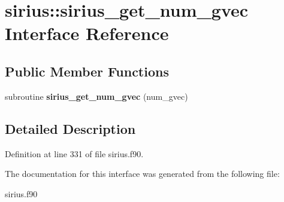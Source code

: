 \hypertarget{interfacesirius_1_1sirius__get__num__gvec}{}\section{sirius\+:\+:sirius\+\_\+get\+\_\+num\+\_\+gvec Interface Reference}
\label{interfacesirius_1_1sirius__get__num__gvec}
\subsection*{Public Member Functions}
\begin{DoxyCompactItemize}
\item 
\hypertarget{interfacesirius_1_1sirius__get__num__gvec_a512405dae9209b275f9b7419abd58af6}{}subroutine {\bfseries sirius\+\_\+get\+\_\+num\+\_\+gvec} (num\+\_\+gvec)\label{interfacesirius_1_1sirius__get__num__gvec_a512405dae9209b275f9b7419abd58af6}

\end{DoxyCompactItemize}


\subsection{Detailed Description}


Definition at line 331 of file sirius.\+f90.



The documentation for this interface was generated from the following file\+:\begin{DoxyCompactItemize}
\item 
sirius.\+f90\end{DoxyCompactItemize}
